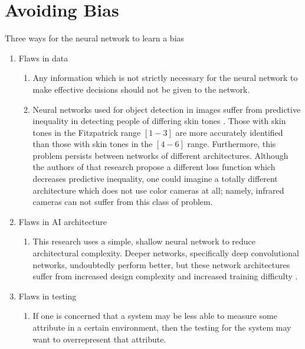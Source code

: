 \documentclass{report}
\begin{document}
\section{Avoiding Bias}

Three ways for the neural network to learn a bias
\begin{enumerate}
    \item Flaws in data
    \begin{enumerate}
        \item Any information which is not strictly necessary for the neural network to make
        effective decisions should not be given to the network.

        \item Neural networks used for object detection in images suffer from predictive inequality
        in detecting people of differing skin tones \cite{wilson2019predictive}. Those with skin
        tones in the Fitzpatrick range $[1-3]$ are more accurately identified than those with skin
        tones in the $[4-6]$ range. Furthermore, this problem persists between networks of different
        architectures. Although the authors of that research propose a different loss function which
        decreases predictive inequality, one could imagine a totally different architecture which
        does not use color cameras at all; namely, infrared cameras can not suffer from this class
        of problem.
    \end{enumerate}
    
    \item Flaws in AI architecture
    \begin{enumerate}
        \item This research uses a simple, shallow neural network to reduce architectural
        complexity. Deeper networks, specifically deep convolutional networks, undoubtedly perform
        better, but these network architectures suffer from increased design complexity and
        increased training difficulty \cite{mhaskar2016deep}.
    \end{enumerate}
    
    \item Flaws in testing
    \begin{enumerate}
        \item If one is concerned that a system may be less able to measure some attribute in a
        certain environment, then the testing for the system may want to overrepresent that
        attribute.


\end{enumerate}
\end{enumerate}
\end{document}
